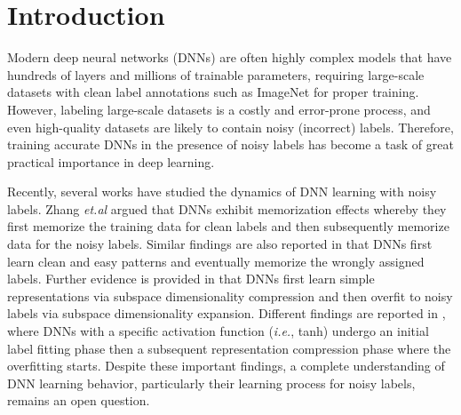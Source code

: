 \documentclass[10pt,twocolumn,letterpaper]{article}
\begin{document}
\section{Introduction}
Modern deep neural networks (DNNs) are often highly complex models that have hundreds of layers and millions of trainable parameters, requiring large-scale datasets with clean label annotations such as ImageNet \cite{deng2009imagenet} for proper training. However, labeling large-scale datasets is a costly and error-prone process, and even high-quality datasets are likely to contain noisy (incorrect) labels. Therefore, training accurate DNNs in the presence of noisy labels has become a task of great practical importance in deep learning.

Recently, several works have studied the dynamics of DNN learning with noisy labels. Zhang \textit{et.al} \cite{zhang2016understanding} argued that DNNs exhibit memorization effects whereby they first memorize the training data for clean labels and then subsequently memorize data for the noisy labels. Similar findings are also reported in \cite{arpit2017closer} that DNNs first learn clean and easy patterns and eventually memorize the wrongly assigned labels.  Further evidence is provided in \cite{ma2018dimensionality} that DNNs first learn simple representations via subspace dimensionality compression and then overfit to noisy labels via subspace dimensionality expansion. Different findings are reported in \cite{shwartz2017opening}, where DNNs with a specific activation function (\textit{i.e.}, tanh) undergo an initial label fitting phase then a subsequent representation compression phase where the overfitting starts. Despite these important findings, a complete understanding of DNN learning behavior, particularly their learning process for noisy labels, remains an open question.
\end{document}
